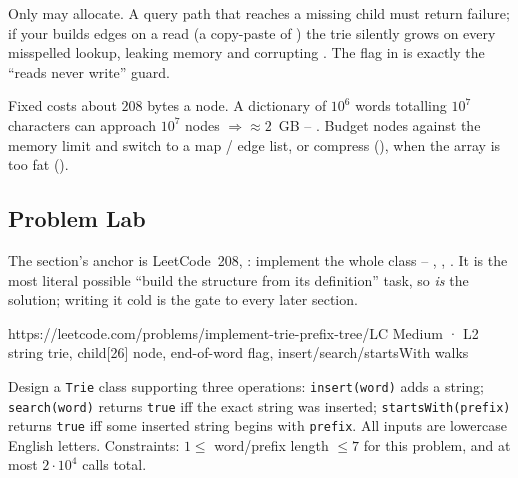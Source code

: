 \begin{warningbox}
Only  may allocate. A query path that reaches a missing child must return failure; if your
 builds edges on a read (a copy-paste of ) the trie silently grows on every
misspelled lookup, leaking memory and corrupting . The  flag in
 is exactly the ``reads never write'' guard.
\end{warningbox}

\begin{warningbox}
Fixed  costs about $208$ bytes a node. A dictionary of $10^6$ words totalling $10^7$
characters can approach $10^7$ nodes $\Rightarrow\approx 2$~GB -- \re. Budget nodes against the memory
limit and switch to a map / edge list, or compress (), when the array is too fat
().
\end{warningbox}

\subsection{Problem Lab}

The section's anchor is LeetCode~208, : implement the whole  class --
, , . It is the most literal possible ``build the structure
from its definition'' task, so  \emph{is} the solution; writing it cold is the gate
to every later section.

  {https://leetcode.com/problems/implement-trie-prefix-tree/}{LC Medium · L2}
  {string trie, child[26] node, end-of-word flag, insert/search/startsWith walks}

\begin{problemstatement}
Design a \texttt{Trie} class supporting three operations: \texttt{insert(word)} adds a string;
\texttt{search(word)} returns \texttt{true} iff the exact string was inserted;
\texttt{startsWith(prefix)} returns \texttt{true} iff some inserted string begins with \texttt{prefix}.
All inputs are lowercase English letters. Constraints: $1\le$ word/prefix length $\le 7$ for this
problem, and at most $2\cdot 10^4$ calls total.
\end{problemstatement}

